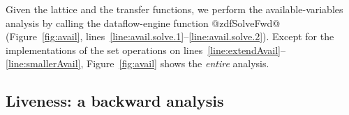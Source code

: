 \documentclass[blockstyle,preprint,natbib,nocopyrightspace]{sigplanconf}
\newcommand\linerangeref[2]{\mbox{lines~\ref{line:#1}--\ref{line:#2}}}
\newcommand{\authornote}[1]{{\em #1}}
\def\authornote#1{\unskip\relax}
\newcommand{\simon}[1]{\authornote{SLPJ: #1}}
\newcommand\figref[1]{Figure~\ref{fig:#1}}
\begin{document}

Given the lattice and the transfer functions,
we perform the available-variables analysis by calling
the dataflow-engine function @zdfSolveFwd@ (\figref{avail},
\linerangeref{avail.solve.1}{avail.solve.2}). 
\simon{But this is really a lie. We actually call the transformation 
function!  I'm not quite sure how to fix this pedagogical point.
NR: It's true that we don't actually have a use for the results of an
independent available-variables analysis, other than to drive the
transformation in the next section.  But just because we have no use
for the results at present does not  make the example analysis
incorrect or invalid, and I think the pedagogy is sound.
}
Except for the implementations of the set operations on
\linerangeref{extendAvail}{smallerAvail}, 
\figref{avail} shows the \emph{entire} analysis.

\subsection{Liveness: a backward analysis} 
\end{document}
